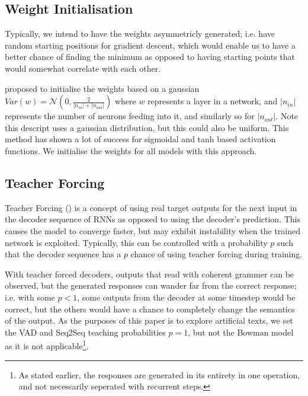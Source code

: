 \documentclass[12pt,twoside]{report}
\begin{document}

\subsection*{Weight Initialisation}

Typically, we intend to have the weights asymmetricly generated; i.e. have random starting positions for gradient descent, which would enable us to have a better chance of finding the minimum as opposed to having starting points that would somewhat correlate with each other.

\cite{glorot_understanding_2010} proposed to initialise the weights based on a gaussian $Var(w)=\mathcal{N}(0,\frac{2}{|n_{in}| + |n_{out}| })$ where $w$ represents a layer in a network, and $|n_{in}|$ represents the number of neurons feeding into it, and similarly so for $|n_{out}|$. Note this descript uses a gaussian distribution, but this could also be uniform. This method has shown a lot of success for sigmoidal and tanh based activation functions. We initialise the weights for all models with this approach.

\subsection*{Teacher Forcing}

Teacher Forcing (\cite{williams_learning_1989}) is a concept of using real target outputs for the next input in the decoder sequence of RNNs as opposed to using the decoder's prediction. This causes the model to converge faster, but may exhibit instability when the trained network is exploited. Typically, this can be controlled with a probability $p$ such that the decoder sequence has a $p$ chance of using teacher forcing during training.

With teacher forced decoders, outputs that read with coherent grammer can be observed, but the generated responses can wander far from the correct response; i.e. with some $p<1$, some outputs from the decoder at some timestep would be correct, but the others would have a chance to completely change the semantics of the output. As the purposes of this paper is to explore artificial texts, we set the VAD and Seq2Seq teaching probabilities $p=1$, but not the Bowman model as it is not applicable\footnote{As stated earlier, the responses are generated in its entirety in one operation, and not necessarily seperated with  recurrent steps.}.
\end{document}
